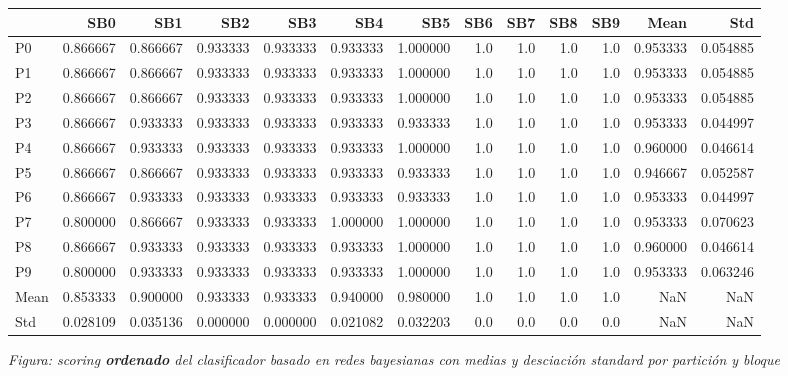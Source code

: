 \documentclass[11pt]{article}
\begin{document}
            \begin{mdframed}[hidealllines=true,backgroundcolor=green!10]
            
    
    \begin{tabular}{lrrrrrrrrrrrr}
\toprule
{} &       SB0 &       SB1 &       SB2 &       SB3 &       SB4 &       SB5 &  SB6 &  SB7 &  SB8 &  SB9 &      Mean &       Std \\
\midrule
P0   &  0.866667 &  0.866667 &  0.933333 &  0.933333 &  0.933333 &  1.000000 &  1.0 &  1.0 &  1.0 &  1.0 &  0.953333 &  0.054885 \\
P1   &  0.866667 &  0.866667 &  0.933333 &  0.933333 &  0.933333 &  1.000000 &  1.0 &  1.0 &  1.0 &  1.0 &  0.953333 &  0.054885 \\
P2   &  0.866667 &  0.866667 &  0.933333 &  0.933333 &  0.933333 &  1.000000 &  1.0 &  1.0 &  1.0 &  1.0 &  0.953333 &  0.054885 \\
P3   &  0.866667 &  0.933333 &  0.933333 &  0.933333 &  0.933333 &  0.933333 &  1.0 &  1.0 &  1.0 &  1.0 &  0.953333 &  0.044997 \\
P4   &  0.866667 &  0.933333 &  0.933333 &  0.933333 &  0.933333 &  1.000000 &  1.0 &  1.0 &  1.0 &  1.0 &  0.960000 &  0.046614 \\
P5   &  0.866667 &  0.866667 &  0.933333 &  0.933333 &  0.933333 &  0.933333 &  1.0 &  1.0 &  1.0 &  1.0 &  0.946667 &  0.052587 \\
P6   &  0.866667 &  0.933333 &  0.933333 &  0.933333 &  0.933333 &  0.933333 &  1.0 &  1.0 &  1.0 &  1.0 &  0.953333 &  0.044997 \\
P7   &  0.800000 &  0.866667 &  0.933333 &  0.933333 &  1.000000 &  1.000000 &  1.0 &  1.0 &  1.0 &  1.0 &  0.953333 &  0.070623 \\
P8   &  0.866667 &  0.933333 &  0.933333 &  0.933333 &  0.933333 &  1.000000 &  1.0 &  1.0 &  1.0 &  1.0 &  0.960000 &  0.046614 \\
P9   &  0.800000 &  0.933333 &  0.933333 &  0.933333 &  0.933333 &  1.000000 &  1.0 &  1.0 &  1.0 &  1.0 &  0.953333 &  0.063246 \\
Mean &  0.853333 &  0.900000 &  0.933333 &  0.933333 &  0.940000 &  0.980000 &  1.0 &  1.0 &  1.0 &  1.0 &       NaN &       NaN \\
Std  &  0.028109 &  0.035136 &  0.000000 &  0.000000 &  0.021082 &  0.032203 &  0.0 &  0.0 &  0.0 &  0.0 &       NaN &       NaN \\
\bottomrule
\end{tabular}

    

            \end{mdframed}
            \endgroup
    \emph{Figura: scoring \textbf{ordenado} del clasificador basado en redes
bayesianas con medias y desciación standard por partición y bloque}
\end{document}
